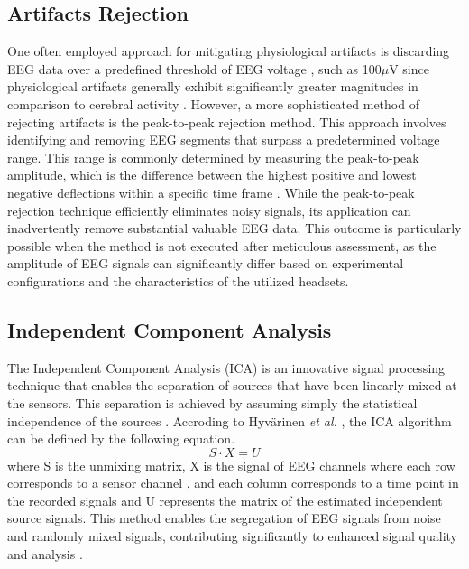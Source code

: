 \subsection{Artifacts Rejection}
One often employed approach for mitigating physiological artifacts is discarding EEG data over a predefined threshold of EEG voltage \cite{jung2000removal}, such as 100$\mu$V since physiological artifacts generally exhibit significantly greater magnitudes in comparison to cerebral activity \cite{survey_brain_biometrics}. However, a more sophisticated method of rejecting artifacts is the peak-to-peak rejection method. This approach involves identifying and removing EEG segments that surpass a predetermined voltage range. This range is commonly determined by measuring the peak-to-peak amplitude, which is the difference between the highest positive and lowest negative deflections within a specific time frame \cite{luck2014introduction}. While the peak-to-peak rejection technique efficiently eliminates noisy signals, its application can inadvertently remove substantial valuable EEG data. This outcome is particularly possible when the method is not executed after meticulous assessment, as the amplitude of EEG signals can significantly differ based on experimental configurations and the characteristics of the utilized headsets.  

\subsection{Independent Component Analysis}
The Independent Component Analysis (ICA) is an innovative signal processing technique that enables the separation of sources that have been linearly mixed at the sensors. This separation is achieved by assuming simply the statistical independence of the sources \cite{vigario2000independent}. Accroding to Hyv\"arinen \textit{et al.} \cite{hyvarinen1999fixed}, the ICA algorithm can be defined by the following equation.
\begin{equation}
S \cdot X=U
\end{equation}
where S is the unmixing matrix, X is the signal of EEG channels where each row corresponds to a sensor channel , and each column corresponds to a time point in the recorded signals and U represents the matrix of the estimated independent source signals. This method enables the segregation of EEG signals from noise and randomly mixed signals, contributing significantly to enhanced signal quality and analysis .  


